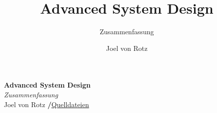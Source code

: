 \documentclass[
  10pt,
  a4paper,
]{article}
\title{Advanced System Design}
\subtitle{Zusammenfassung}
\author{Joel von Rotz}
\date{}
\begin{document}
\begin{multicols*}{2}
  
  \raggedcolumns
  
\makeatletter
\begin{center}
  \vspace*{0.5cm}
  \textbf{\textsf{\Huge Advanced System Design}}\\
  \vspace{0.1cm}
  \textsf{\textit{\large Zusammenfassung}}\\
  \vspace{0.5cm}
  \textsf{\large Joel von
Rotz \hspace{0.3cm}\textbf{/}\hspace{0.3cm}\mbox{\large \faGithub\space \href{https://github.com/joelvonrotz/BSc-electrical-engineering/tree/main/semester\%206/advanced\%20system\%20design}{Quelldateien}}}
\end{center}
\makeatother
\normalfont





\ifdefined\Shaded
  \renewenvironment{Shaded}
    {\begin{tcolorbox}[
      rounded corners,
      colback={codebgcolor},
      colframe={codebgcolor},
      enhanced,
      boxrule=0mm,
      borderline={1pt}{0pt}{gray,dotted},
      left=0mm,
      breakable,
      overlay first={%
          \draw[thick,gray,line width=0.5pt,decoration={zigzag,segment length=4mm, amplitude=2mm/(2*sqrt(2))},decorate]
            (frame.south west) -- (frame.south east);
      },
      overlay middle={%
          \draw[thick,gray,line width=0.5pt,decoration={zigzag,segment length=4mm, amplitude=2mm/(2*sqrt(2))},decorate]
            (frame.south west) -- (frame.south east);
          \draw[thick,gray,line width=0.5pt,decoration={zigzag,segment length=4mm, amplitude=2mm/(2*sqrt(2))},decorate]
            (frame.north west) -- (frame.north east);
      },
      overlay last={%
          \draw[thick,gray,line width=0.5pt,decoration={zigzag,segment length=4mm, amplitude=2mm/(2*sqrt(2))},decorate]
            (frame.north west) -- (frame.north east);
      }
      ]}
    {\end{tcolorbox}}
\fi


\end{multicols*}
\end{document}
